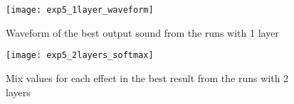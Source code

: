 \begin{figure}[h]
    \centering
    \texttt{[image: exp5\_1layer\_waveform]}
    \caption{Waveform of the best output sound from the runs with 1 layer}
    \label{fig:exp5_1layer_waveform}
\end{figure}

\begin{figure}[h]
    \centering
    \texttt{[image: exp5\_2layers\_softmax]}
    \caption{Mix values for each effect in the best result from the runs with 2 layers}
    \label{fig:exp5_2layers_softmax}
\end{figure}
